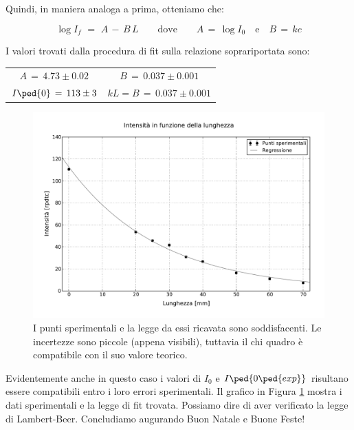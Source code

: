 Quindi, in maniera analoga a prima, otteniamo che:

\begin{equation}
	\log{I_f} \,\,=\,\, A \,-\, B \, L \qquad \text{dove} \qquad A \,=\, \log{I_0} \quad \text{e} \quad B\,=\, kc
\end{equation}

I valori trovati dalla procedura di fit sulla relazione soprariportata sono:

\begin{center}
\vspace{-2mm}
\begin{tabular}{c c}
	$A \,=\, 4.73 \pm 0.02$ & $B \,=\, 0.037 \pm 0.001$ \\
	$I\ped{0} \,=\, 113 \pm 3$ & $kL = B \,=\, 0.037 \pm 0.001$ \\
\end{tabular}
\vspace{-2mm}
\end{center}

\begin{figure}
    \includegraphics[width=135mm]{g2.pdf}
    \caption{I punti sperimentali e la legge da essi ricavata sono soddisfacenti. Le incertezze sono piccole (appena visibili),
        tuttavia il chi quadro è compatibile con il suo valore teorico.}
    \label{fig:g2}
\end{figure}

Evidentemente anche in questo caso i valori di $I_0$ e $I\ped{0\ped{exp}}$ risultano essere compatibili entro i loro errori sperimentali.
Il grafico in Figura \ref{fig:g2} mostra i dati sperimentali e la legge di fit trovata.
Possiamo dire di aver verificato la legge di Lambert-Beer. Concludiamo augurando Buon Natale e Buone Feste!
